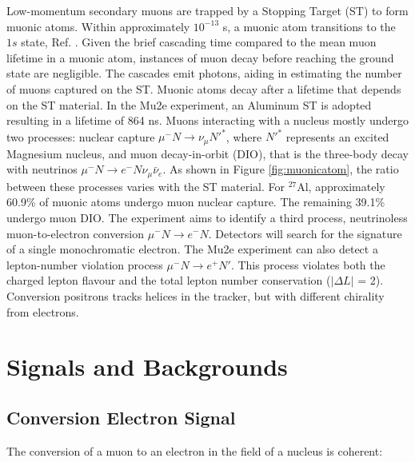Low-momentum secondary muons are trapped by a Stopping Target (ST) to form muonic atoms. 
Within approximately $10^{-13}$ s, 
a muonic atom transitions to the $1s$ state, Ref. \cite{MEASDAY2001243}. 
Given the brief cascading time compared to the mean muon lifetime in a muonic atom,  
instances of muon decay before reaching the ground state are negligible. 
The cascades emit photons, aiding in estimating the number of muons captured 
on the ST. 
Muonic atoms decay after a lifetime that depends on the ST material. 
In the Mu2e experiment, an Aluminum ST is adopted resulting in a lifetime of 
864 ns. Muons interacting with a nucleus mostly undergo two processes: 
nuclear capture $\mu^- N \rightarrow \nu_\mu N'^* $, where $N'^*$ represents an excited 
Magnesium nucleus, and muon decay-in-orbit (DIO), 
that is the three-body decay with neutrinos $\mu ^- N \rightarrow e^- N \nu_\mu \bar{\nu}_e$. 
As shown in Figure \ref{fig:muonicatom}, the ratio between these 
processes varies with the ST material. For $^{27}$Al, approximately 60.9\% 
of muonic atoms undergo muon nuclear capture. The remaining 39.1\% undergo muon DIO. 
The experiment aims to identify a third process, neutrinoless muon-to-electron 
conversion $\mu^- N \rightarrow e^- N $. Detectors will search for the signature of a 
single monochromatic electron.
The Mu2e experiment can also detect a lepton-number violation process 
$\mu^- N \rightarrow e^+ N'$.
This process violates both the charged lepton flavour and the total lepton number 
conservation ($|\Delta L|$ = 2). 
Conversion positrons tracks helices in the tracker, but with different chirality from electrons. 
\section{Signals and Backgrounds}\label{sigandbkg}
\subsection{Conversion Electron Signal}
{\red The conversion of a muon to an electron in the field of a nucleus is coherent: }


